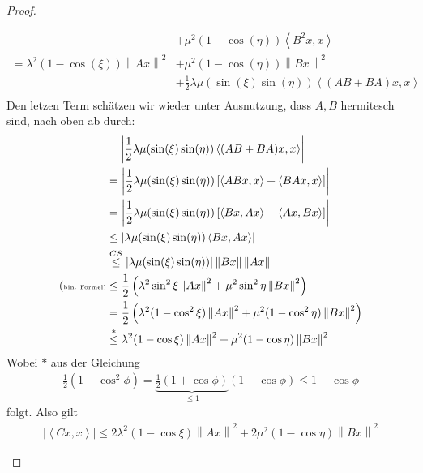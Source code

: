 \begin{proof}
\begin{enumerate}[label=\protect\circled{\arabic{*}}]
\begin{align}
            & + \mu^2 (1 - \cos(\eta) ) \left<B^2x,x \right> \nonumber \\
            = \lambda^2 (1 - \cos(\xi)) \left\| Ax\right\|^2 & + \mu^2 (1 - \cos(\eta) ) \left\| Bx \right\|^2 \nonumber \\
            & + \frac{1}{2} \lambda \mu (\sin(\xi)\sin(\eta)) \left< (AB+BA)x,x \right> \nonumber \\
        \end{align}
        Den letzen Term schätzen wir wieder unter Ausnutzung, dass $A,B$ hermitesch sind, nach oben ab durch:
        \begin{align}
            &\phantom{....} \left| \frac{1}{2} \lambda \mu (\sin(\xi)\sin(\eta)) \left< (AB+BA)x,x \right> \right|\nonumber \\
            &=  \left|\frac{1}{2} \lambda \mu (\sin(\xi)\sin(\eta)) \left[ \left< ABx,x \right> + \left< BAx,x \right>\right] \right| \nonumber \\
            &= \left| \frac{1}{2} \lambda \mu (\sin(\xi)\sin(\eta)) \left[ \left< Bx,Ax \right> + \left< Ax,Bx \right>\right] \right| \nonumber \\
            &\le \left| \lambda \mu (\sin(\xi)\sin(\eta)) \left< Bx,Ax \right> \right| \nonumber \\
            & \overset{CS}{\le} \left| \lambda \mu (\sin(\xi)\sin(\eta)) \right|  \left\| Bx \right\| \left\| Ax \right\|\nonumber \\
            \text{(\tiny{bin. Formel})}&\le \frac{1}{2} \left( \lambda^2 \sin^2\xi \left\| Ax \right\|^2 + \mu^2 \sin^2\eta \left\| Bx \right\|^2 \right) \nonumber \\
            &= \frac{1}{2} \left( \lambda^2 (1-\cos^2\xi) \left\| Ax \right\|^2 + \mu^2 (1-\cos^2\eta) \left\| Bx \right\|^2 \right) \nonumber \\
            & \overset{*}{\le}  \lambda^2 (1-\cos\xi) \left\| Ax \right\|^2 + \mu^2 (1-\cos\eta) \left\| Bx \right\|^2 \nonumber \\
        \end{align}
        Wobei $*$ aus der Gleichung
        \begin{align*}
            \frac{1}{2} (1 -\cos^2 \phi) = \underbrace{\frac{1}{2} (1 + \cos \phi)}_{\le 1} (1- \cos \phi) \le 1 - \cos \phi
        \end{align*}
        folgt. Also gilt 
        \begin{align}
            \left| \left<Cx,x \right> \right| \le 2\lambda^2 (1-\cos\xi) \left\| Ax \right\|^2 + 2\mu^2 (1-\cos\eta) \left\| Bx \right\|^2

\end{align}
\end{enumerate}
\end{proof}
